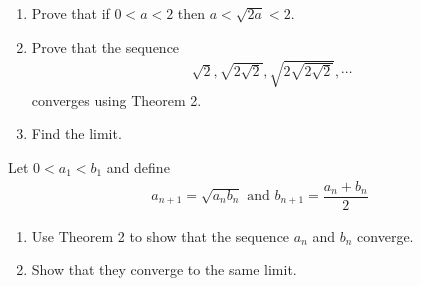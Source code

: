 \documentclass[9pt, a4paper, oneside, reqno]{amsart}
\begin{document}
\begin{questions}
	\item
	\begin{enumerate}
		\item Prove that if $ 0 < a < 2$ then $ a < \sqrt{2a} < 2$.
		\item Prove that the sequence
		      \begin{align*}
		      	\sqrt{2}, \sqrt{2\sqrt{2}}, \sqrt{2\sqrt{2\sqrt{2}}}, \cdots
		      \end{align*}
		      converges using Theorem 2.
		\item Find the limit.
	\end{enumerate}

	\item Let $ 0 < a_1 < b_1$ and define
	\begin{align*}
		a_{n+1} = \sqrt{a_n b_n} \mbox{ and } b_{n+1} = \dfrac{a_n + b_n}{2}
	\end{align*}
	\begin{enumerate}
		\item Use Theorem 2 to show that the sequence $ a_n$ and $ b_n$
		      converge.
		\item Show that they converge to the same limit.
	\end{enumerate}
\end{questions}

\newpage
\end{document}
